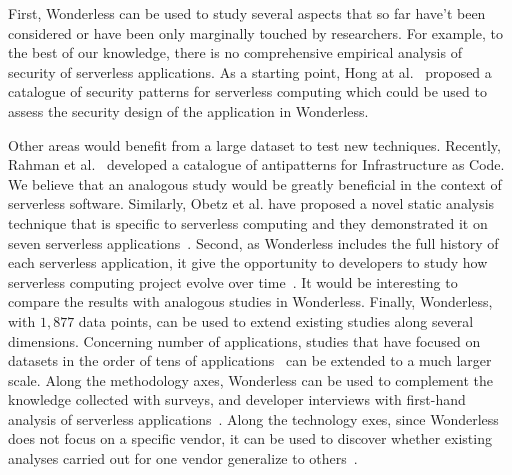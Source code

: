 First, Wonderless can be used to study several aspects that so far have't
been considered or have been only marginally touched by researchers.
For example, to the best of our knowledge, there is no comprehensive 
empirical analysis of security of serverless applications. 
As a starting point, Hong at al.~\cite{216833} proposed a catalogue of
security patterns for serverless computing which could be used to assess
the security design of the application in  Wonderless.


%
Other areas would benefit from a large dataset to test new techniques.
Recently, Rahman et al.~\cite{DBLP:journals/ese/RahmanFW20} developed a 
catalogue of antipatterns for Infrastructure as Code. We believe that an analogous 
study would be greatly beneficial in the context of serverless software.
Similarly, Obetz et al. have proposed a novel static analysis technique that is  
specific to serverless computing and they demonstrated it on 
seven serverless applications~\cite{10.5555/3357034.3357059}.
%
Second, as Wonderless includes the full history of each serverless application, 
it give the opportunity to developers to study how serverless computing 
project evolve over time~\cite{sousa2020characterizing, du2020understanding, wen2020empirical}. 
It would be interesting to compare the results with analogous studies in Wonderless.
%
Finally, Wonderless, with $1,877$ data points, can be used to extend existing 
studies along several dimensions. Concerning number of applications,
studies that have focused on datasets in the order of tens of 
applications~\cite{eismann2020serverless} can be extended to a much larger scale.
Along the methodology axes, Wonderless can be used to complement the knowledge collected 
with surveys, and developer interviews with first-hand analysis of
serverless applications~\cite{leitner2019mixed}.
Along the technology exes, since Wonderless does not focus on a specific vendor, it can be used
to discover whether existing analyses carried out for one vendor
generalize to others~\cite{spillner2019quantitative}.











